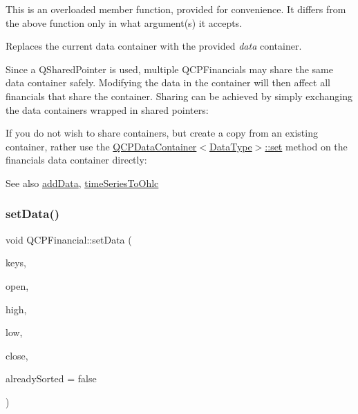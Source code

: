 This is an overloaded member function, provided for convenience. It differs from the above function only in what argument(s) it accepts.

Replaces the current data container with the provided {\itshape data} container.

Since a Q\+Shared\+Pointer is used, multiple Q\+C\+P\+Financials may share the same data container safely. Modifying the data in the container will then affect all financials that share the container. Sharing can be achieved by simply exchanging the data containers wrapped in shared pointers\+: 
\begin{DoxyCodeInclude}
\end{DoxyCodeInclude}
 If you do not wish to share containers, but create a copy from an existing container, rather use the \hyperlink{class_q_c_p_data_container_ae7042bd534fc3ce7befa2ce3f790b5bf}{Q\+C\+P\+Data\+Container$<$\+Data\+Type$>$\+::set} method on the financial\textquotesingle{}s data container directly\+: 
\begin{DoxyCodeInclude}
\end{DoxyCodeInclude}
 \begin{DoxySeeAlso}{See also}
\hyperlink{class_q_c_p_financial_a372ac031e44a7a6c912d203556af96f7}{add\+Data}, \hyperlink{class_q_c_p_financial_a9a058c035040d3939b8884f4aaccb1a7}{time\+Series\+To\+Ohlc} 
\end{DoxySeeAlso}
\mbox{\label{class_q_c_p_financial_a12992e669ed19d7bb48dbe601570cc05}} 
\subsubsection{\texorpdfstring{set\+Data()}{setData()}\hspace{0.1cm}{\footnotesize\ttfamily [2/2]}}
{\footnotesize\ttfamily void Q\+C\+P\+Financial\+::set\+Data (\begin{DoxyParamCaption}\item[{const Q\+Vector$<$ double $>$ \&}]{keys,  }\item[{const Q\+Vector$<$ double $>$ \&}]{open,  }\item[{const Q\+Vector$<$ double $>$ \&}]{high,  }\item[{const Q\+Vector$<$ double $>$ \&}]{low,  }\item[{const Q\+Vector$<$ double $>$ \&}]{close,  }\item[{bool}]{already\+Sorted = {\ttfamily false} }\end{DoxyParamCaption})}

